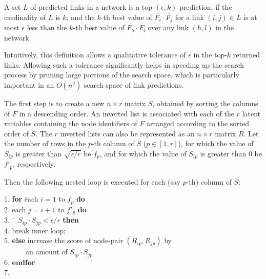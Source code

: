 \begin{definition}[top-$(\epsilon, k)$ predictions]
A set $L$ of predicted links in a network is a top-$(\epsilon, k)$ prediction, if
the cardinality of $L$ is $k$, and the $k$-th best  value of
$\overline{F_i} \cdot \overline{F_j}$ for a link $(i, j) \in L$ is
at most $\epsilon$ less than the $k$-th best value of
$\overline{F_h} \cdot \overline{F_l}$ over any link $(h , l)$ in the
network.
\end{definition}
Intuitively, this definition allows a qualitative  tolerance of
$\epsilon$ in the top-$k$ returned links. Allowing such a tolerance
significantly helps in speeding up the search process by pruning
large portions of the search space, which is particularly important
in an $O(n^2)$ search space of link predictions.

The first step is to create a new $n \times r$ matrix $S$,
obtained by sorting the columns of $F$ in a descending order. An inverted list is
associated with each of the $r$ latent variables containing the node
identifiers  of $F$ arranged according to the sorted order of $S$. The
$r$ inverted lists can also be represented as an $n \times r$ matrix
$R$. Let the number of rows in the $p$-th column of $S$ ($p\in[1, r]$), for which
the value of $S_{ip}$ is greater than $\sqrt{\epsilon/r}$ be $f_p$, and for which the value of $S_{ip}$ is greater than 0 be $f'_p$, respectively.

Then the following nested loop is executed for each (say $p$-th) column of $S$:

\begin{tabbing}1. \hspace{5ex}\=
{\bf for} \= each $i=1$ to $f_p$ {\bf do}\\
2. \> \= each $j=i+1$ to $f'_p$ {\bf do}\\
3. \>\>\ \= $S_{ip} \cdot S_{jp} < \epsilon/r$ {\bf then}\\
4. \>\>\>\>break inner loop; \\
5. \>\>\> {\bf else} increase the score of node-pair $(R_{ip}, R_{jp})$ by \\
   \>\>\> \ \ \ \ \ \ an amount of $S_{ip} \cdot S_{jp}$\\
6. \>\> {\bf endfor}\\
7. 
\end{tabbing}

